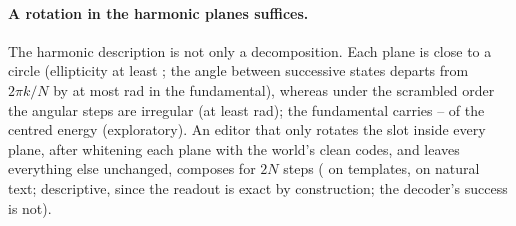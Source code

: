 \paragraph{A rotation in the harmonic planes suffices.}
The harmonic description is not only a decomposition. Each plane is close to a circle (ellipticity at least \CLtwentythreeEllLo{}; the
angle between successive states departs from $2\pi k/N$ by at most \CLtwentythreeAngHi{} rad in the fundamental), whereas under the
scrambled order the angular steps are irregular (at least \CLtwentythreeScrAngLo{} rad); the fundamental carries
\CLtwentythreeFundLo{}--\CLtwentythreeFundHi{} of the centred energy (exploratory). An editor that only rotates the slot inside every
plane, after whitening each plane with the world's clean codes, and leaves everything else unchanged, composes for $2N$ steps
(\CLtwentythreeRotTzero{} on templates, \CLtwentythreeRotNat{} on natural text; descriptive, since the readout is exact by construction;
the decoder's success is not).

